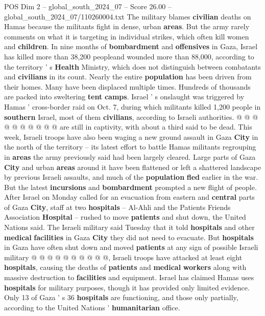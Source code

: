 \begin{textsample}{POS Dim 2 – global\_south\_2024\_07 – Score 26.00 – global\_south\_2024\_07/110260004.txt}
The military blames \textbf{civilian} deaths on Hamas because the militants fight in dense, urban \textbf{areas}.
But the army rarely comments on what it is targeting in individual strikes, which often kill women and \textbf{children}.
In nine months of \textbf{bombardment} and \textbf{offensives} in Gaza, Israel has killed more than 38,200 peopleand wounded more than 88,000, according to the territory ' s \textbf{Health} Ministry, which does not distinguish between combatants and \textbf{civilians} in its count.
Nearly the entire \textbf{population} has been driven from their homes.
Many have been displaced multiple times.
Hundreds of thousands are packed into sweltering \textbf{tent} \textbf{camps}.
Israel ' s onslaught was triggered by Hamas ' cross-border raid on Oct. 7, during which militants killed 1,200 people in \textbf{southern} Israel, most of them \textbf{civilians}, according to Israeli authorities. @ @ @ @ @ @ @ @ @ @ are still in captivity, with about a third said to be dead.
This week, Israeli troops have also been waging a new ground assault in Gaza \textbf{City} in the north of the territory -- its latest effort to battle Hamas militants regrouping in \textbf{areas} the army previously said had been largely cleared.
Large parts of Gaza \textbf{City} and urban \textbf{areas} around it have been flattened or left a shattered landscape by previous Israeli assaults, and much of the \textbf{population} \textbf{fled} earlier in the war.
But the latest \textbf{incursions} and \textbf{bombardment} prompted a new flight of people.
After Israel on Monday called for an evacuation from eastern and \textbf{central} parts of Gaza \textbf{City}, staff at two \textbf{hospitals} -- Al-Ahli and the Patients Friends Association \textbf{Hospital} -- rushed to move \textbf{patients} and shut down, the United Nations said.
The Israeli military said Tuesday that it told \textbf{hospitals} and other \textbf{medical} \textbf{facilities} in Gaza \textbf{City} they did not need to evacuate.
But \textbf{hospitals} in Gaza have often shut down and moved \textbf{patients} at any sign of possible Israeli military @ @ @ @ @ @ @ @ @ @, Israeli troops have attacked at least eight \textbf{hospitals}, causing the deaths of \textbf{patients} and \textbf{medical} \textbf{workers} along with massive destruction to \textbf{facilities} and equipment.
Israel has claimed Hamas uses \textbf{hospitals} for military purposes, though it has provided only limited evidence.
Only 13 of Gaza ' s 36 \textbf{hospitals} are functioning, and those only partially, according to the United Nations ' \textbf{humanitarian} office.

\end{textsample}
